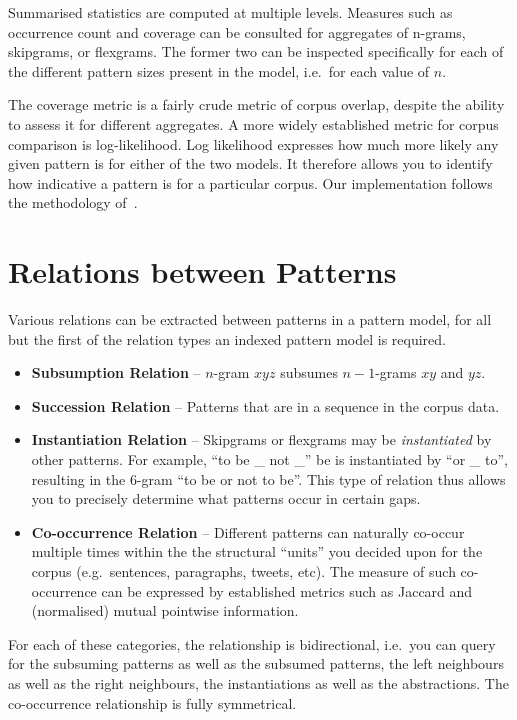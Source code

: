\documentclass[review]{elsarticle}
\begin{document}
Summarised statistics are computed at multiple levels. Measures such as
occurrence count and coverage can be consulted for aggregates of n-grams,
skipgrams, or flexgrams. The former two can be inspected specifically for each
of the different pattern sizes present in the model, i.e.\ for each value of $n$.

The coverage metric is a fairly crude metric of corpus overlap, despite the
ability to assess it for different aggregates. A more widely established metric
for corpus comparison is log-likelihood. Log likelihood expresses how much more
likely any given pattern is for either of the two models. It therefore allows
you to identify how indicative a pattern is for a particular corpus. Our
implementation follows the methodology of~\cite{Rayson00comparingcorpora}.

\section{Relations between Patterns}

Various relations can be extracted between patterns in a pattern model, for all
but the first of the relation types an indexed pattern model is required.

\begin{itemize}
 \item \textbf{Subsumption Relation} -- $n$-gram $x y z$ subsumes $n-1$-grams $x y$ and $y z$. 
 \item \textbf{Succession Relation} -- Patterns that are in a sequence in the corpus data. 
 \item \textbf{Instantiation Relation} -- Skipgrams or flexgrams may be
     \emph{instantiated} by other patterns. For example, ``to be \_ not \_'' be
     is instantiated by ``or \_ to'', resulting in the 6-gram ``to be or not to be''. This type of relation thus allows you to precisely determine what patterns occur in certain gaps.
 \item \textbf{Co-occurrence Relation} -- Different patterns can naturally co-occur multiple times
     within the the structural ``units'' you decided upon for the corpus (e.g.\ 
     sentences, paragraphs, tweets, etc). The measure of such co-occurrence 
     can be expressed by established metrics such as Jaccard and (normalised) mutual
     pointwise information.
\end{itemize}

For each of these categories, the relationship is bidirectional, i.e.\ you can
query for the subsuming patterns as well as the subsumed patterns, the left
neighbours as well as the right neighbours, the instantiations as well as the
abstractions. The co-occurrence relationship is fully symmetrical. 
\end{document}
